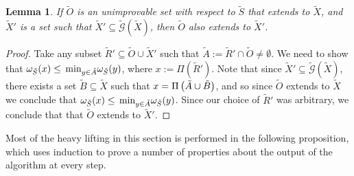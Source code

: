 \documentclass[twocolumn,showpacs,preprintnumbers,amsmath,amssymb,nofootinbib,pra,floatfix]{revtex4-1}
\newtheorem{lemma}{Lemma}
\newenvironment{remark}[1][Remark]{\begin{trivlist}
\item[\hskip \labelsep {\bfseries #1}]}{\end{trivlist}}
\newcommand{\set}{\tilde}
\newcommand{\genfun}{\tilde{\mathcal{G}}}
\begin{document}
\begin{lemma}
\label{lemma:recombining extension elements preserves extension}
If $\set O$ is an unimprovable set with respect to $\set S$ that extends to $\set X$, and $\set X'$ is a set such that $\set X'\subseteq\genfun(\set X)$, then $\set O$ also extends to $\set X'$.
\end{lemma}

\begin{proof}
Take any subset $\set R' \subseteq \set O\cup\set X'$ such that $\set A := \set R'\cap \set O \ne \emptyset$.  We need to show that $\om_{\set S}(x)\le\min_{y\in\set A}\om_{\set S}(y)$, where $x := \Pi(\set R')$.  Note that since $\set X'\subseteq\genfun(\set X)$, there exists a set $\set B\subseteq \set X$ such that $x = \Pi\paren{\set A\cup\set B}$, and so since $\set O$ extends to $\set X$ we conclude that $\om_{\set S}(x)\le\min_{y\in\set A}\om_{\set S}(y)$.  Since our choice of $\set R'$ was arbitrary, we conclude that that $\set O$ extends to $\set X'$.
\end{proof}
\begin{remark}
Most of the heavy lifting in this section is performed in the following proposition, which uses induction to prove a number of properties about the output of the algorithm at every step.
\end{remark}
\end{document}
